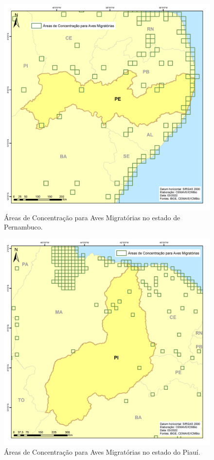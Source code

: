 \documentclass[
  oneside]{scrbook}
\begin{document}
\begin{figure}[H]

{\centering \includegraphics[width=0.75\linewidth]{imagens/cap07/Figura_7.16_PE} 

}

\caption{Áreas de Concentração para Aves Migratórias no estado de Pernambuco.}\label{fig:36}
\end{figure}

\begin{figure}[H]

{\centering \includegraphics[width=0.75\linewidth]{imagens/cap07/Figura_7.17_PI} 

}

\caption{Áreas de Concentração para Aves Migratórias no estado do Piauí.}\label{fig:37}
\end{figure}
\end{document}
